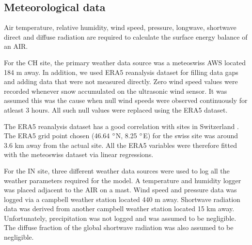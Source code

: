 \documentclass[utf8]{frontiersSCNS} %
\begin{document}
\subsection{Meteorological data}
Air temperature, relative humidity, wind speed, pressure, longwave, shortwave direct and diffuse radiation are required
to calculate the surface energy balance of an AIR.

For the CH site, the primary weather data source was a meteoswiss AWS located 184 m away. In addition, we used ERA5
reanalysis dataset \citep{era5} for filling data gaps and adding data that were not measured directly. Zero wind speed values were recorded whenever snow accumulated on the ultrasonic wind sensor. It was
assumed this was the cause when null wind speeds were observed continuously for atleast 3 hours. All such null values
were replaced using the ERA5 dataset.

The ERA5 reanalysis dataset has a good correlation with sites in Switzerland \citep{Scherrer_2020}. The ERA5 grid point
chosen (46.64 $\degree$N, 8.25 $\degree$E) for the swiss site was around 3.6 km away from the actual site.  All the ERA5
variables were therefore fitted with the meteoswiss dataset via linear regressions.

For the IN site, three different weather data sources were used to log all the weather parameters required for the
model. A temperature and humidity logger was placed adjacent to the AIR on a mast. Wind speed and pressure data was
logged via a campbell weather station located 440 m away. Shortwave radiation data was derived from another campbell
weather station located 15 km away. Unfortunately, precipitation was not logged and was assumed to be negligible.
The diffuse fraction of the global shortwave radiation was also assumed to be negligible.
\end{document}
